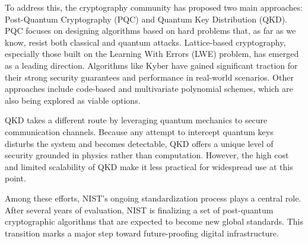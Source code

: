 \documentclass[conference]{IEEEtran}
\begin{document}
To address this, the cryptography community has proposed two main approaches: Post-Quantum Cryptography (PQC) and Quantum Key Distribution (QKD). PQC focuses on designing algorithms based on hard problems that, as far as we know, resist both classical and quantum attacks. Lattice-based cryptography, especially those built on the Learning With Errors (LWE) problem, has emerged as a leading direction. Algorithms like Kyber have gained significant traction for their strong security guarantees and performance in real-world scenarios. Other approaches include code-based and multivariate polynomial schemes, which are also being explored as viable options.

QKD takes a different route by leveraging quantum mechanics to secure communication channels. Because any attempt to intercept quantum keys disturbs the system and becomes detectable, QKD offers a unique level of security grounded in physics rather than computation. However, the high cost and limited scalability of QKD make it less practical for widespread use at this point.

Among these efforts, NIST’s ongoing standardization process plays a central role. After several years of evaluation, NIST is finalizing a set of post-quantum cryptographic algorithms that are expected to become new global standards. This transition marks a major step toward future-proofing digital infrastructure.
\end{document}
